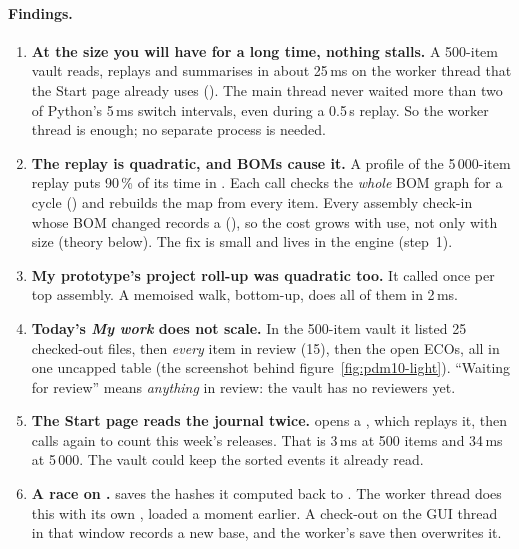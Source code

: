 \paragraph{Findings.}
\begin{enumerate}[nosep]
  \item \textbf{At the size you will have for a long time, nothing stalls.} A 500-item vault reads, replays and summarises
        in about 25\,ms on the worker thread that the Start page already uses (). The main thread never
        waited more than two of Python's 5\,ms switch intervals, even during a 0.5\,s replay. So the worker thread is enough;
        no separate process is needed.
  \item \textbf{The replay is quadratic, and BOMs cause it.} A profile of the 5\,000-item replay puts 90\,\% of its time in
        . Each call checks the \emph{whole} BOM graph for a cycle () and rebuilds the
         map from every item. Every assembly check-in whose BOM changed records a 
        (), so the cost grows with use, not only with size (theory below). The fix is small and
        lives in the engine (step~1).
  \item \textbf{My prototype's project roll-up was quadratic too.} It called  once per top assembly.
        A memoised walk, bottom-up, does all of them in 2\,ms.
  \item \textbf{Today's \emph{My work} does not scale.} In the 500-item vault it listed 25 checked-out files, then
        \emph{every} item in review (15), then the open ECOs, all in one uncapped table (the screenshot behind
        figure~\ref{fig:pdm10-light}). ``Waiting for review'' means \emph{anything} in review: the vault has no reviewers yet.
  \item \textbf{The Start page reads the journal twice.}  opens a , which replays it,
        then calls  again to count this week's releases. That is 3\,ms at 500 items and 34\,ms
        at 5\,000. The vault could keep the sorted events it already read.
  \item \textbf{A race on .}  saves the hashes it computed back to
        . The worker thread does this with its own , loaded a moment
        earlier. A check-out on the GUI thread in that window records a new base, and the worker's save then overwrites it.

\end{enumerate}
